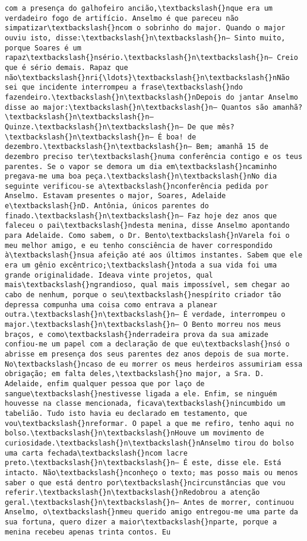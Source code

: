 \documentclass[11pt]{article}
\begin{document}
\begin{Verbatim}[commandchars=\\\{\}]
com a presença do galhofeiro ancião,\textbackslash{}nque era um verdadeiro fogo de artifício. Anselmo é que pareceu não simpatizar\textbackslash{}ncom o sobrinho do major. Quando o major ouviu isto, disse:\textbackslash{}n\textbackslash{}n— Sinto muito, porque Soares é um rapaz\textbackslash{}nsério.\textbackslash{}n\textbackslash{}n— Creio que é sério demais. Rapaz que não\textbackslash{}nri{\ldots}\textbackslash{}n\textbackslash{}nNão sei que incidente interrompeu a frase\textbackslash{}ndo fazendeiro.\textbackslash{}n\textbackslash{}nDepois do jantar Anselmo disse ao major:\textbackslash{}n\textbackslash{}n— Quantos são amanhã?\textbackslash{}n\textbackslash{}n— Quinze.\textbackslash{}n\textbackslash{}n— De que mês?\textbackslash{}n\textbackslash{}n— É boa! de dezembro.\textbackslash{}n\textbackslash{}n— Bem; amanhã 15 de dezembro preciso ter\textbackslash{}numa conferência contigo e os teus parentes. Se o vapor se demora um dia em\textbackslash{}ncaminho pregava-me uma boa peça.\textbackslash{}n\textbackslash{}nNo dia seguinte verificou-se a\textbackslash{}nconferência pedida por Anselmo. Estavam presentes o major, Soares, Adelaide e\textbackslash{}nD. Antônia, únicos parentes do finado.\textbackslash{}n\textbackslash{}n— Faz hoje dez anos que faleceu o pai\textbackslash{}ndesta menina, disse Anselmo apontando para Adelaide. Como sabem, o Dr. Bento\textbackslash{}nVarela foi o meu melhor amigo, e eu tenho consciência de haver correspondido à\textbackslash{}nsua afeição até aos últimos instantes. Sabem que ele era um gênio excêntrico;\textbackslash{}ntoda a sua vida foi uma grande originalidade. Ideava vinte projetos, qual mais\textbackslash{}ngrandioso, qual mais impossível, sem chegar ao cabo de nenhum, porque o seu\textbackslash{}nespírito criador tão depressa compunha uma coisa como entrava a planear outra.\textbackslash{}n\textbackslash{}n— É verdade, interrompeu o major.\textbackslash{}n\textbackslash{}n— O Bento morreu nos meus braços, e como\textbackslash{}nderradeira prova da sua amizade confiou-me um papel com a declaração de que eu\textbackslash{}nsó o abrisse em presença dos seus parentes dez anos depois de sua morte. No\textbackslash{}ncaso de eu morrer os meus herdeiros assumiriam essa obrigação; em falta deles,\textbackslash{}no major, a Sra. D. Adelaide, enfim qualquer pessoa que por laço de sangue\textbackslash{}nestivesse ligada a ele. Enfim, se ninguém houvesse na classe mencionada, ficava\textbackslash{}nincumbido um tabelião. Tudo isto havia eu declarado em testamento, que vou\textbackslash{}nreformar. O papel a que me refiro, tenho aqui no bolso.\textbackslash{}n\textbackslash{}nHouve um movimento de curiosidade.\textbackslash{}n\textbackslash{}nAnselmo tirou do bolso uma carta fechada\textbackslash{}ncom lacre preto.\textbackslash{}n\textbackslash{}n— É este, disse ele. Está intacto. Não\textbackslash{}nconheço o texto; mas posso mais ou menos saber o que está dentro por\textbackslash{}ncircunstâncias que vou referir.\textbackslash{}n\textbackslash{}nRedobrou a atenção geral.\textbackslash{}n\textbackslash{}n— Antes de morrer, continuou Anselmo, o\textbackslash{}nmeu querido amigo entregou-me uma parte da sua fortuna, quero dizer a maior\textbackslash{}nparte, porque a menina recebeu apenas trinta contos. Eu 
\end{Verbatim}
\end{document}
